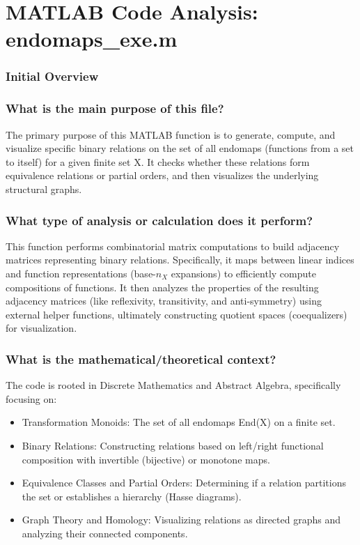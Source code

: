 
\chapter{MATLAB Code Analysis: endomaps_exe.m}

\subsection*{Initial Overview}
\subsection* { \hspace*{0.2cm} What is the main purpose of this file?}
The primary purpose of this MATLAB function is to generate, compute, and visualize specific binary relations on the set of all endomaps (functions from a set to itself) for a given finite set X. It checks whether these relations form equivalence relations or partial orders, and then visualizes the underlying structural graphs.


\subsection*{ \hspace*{0.2cm} What type of analysis or calculation does it perform?}
This function performs combinatorial matrix computations to build adjacency matrices representing binary relations. Specifically, it maps between linear indices and function representations  (base-$n_X$ expansions) to efficiently compute compositions of functions. It then analyzes the properties of the resulting adjacency matrices (like reflexivity, transitivity, and anti-symmetry) using external helper functions, ultimately constructing quotient spaces (coequalizers) for visualization.

\subsection*{ \hspace*{0.2cm} What is the mathematical/theoretical context?}
The code is rooted in Discrete Mathematics and Abstract Algebra, specifically focusing on: 
\begin{itemize}
    \item Transformation Monoids: The set of all endomaps End(X) on a finite set.
\end{itemize}
\begin{itemize}
    \item Binary Relations: Constructing relations based on left/right functional composition with invertible (bijective) or monotone maps.
    \item Equivalence Classes and Partial Orders: Determining if a relation partitions the set or establishes a hierarchy (Hasse diagrams).
\end{itemize}
\begin{itemize}
    \item Graph Theory and Homology: Visualizing relations as directed graphs and analyzing their connected components.
\end{itemize}


